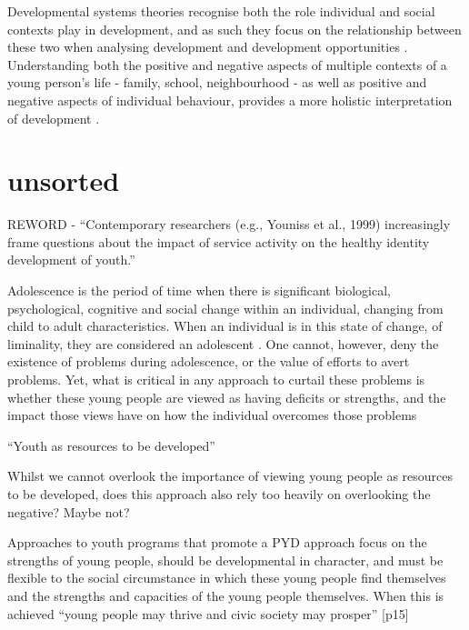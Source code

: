 Developmental systems theories recognise both the role individual and social contexts play in development, and as such they focus on the relationship between these two when analysing development and development opportunities \citep{Lerner2010}. Understanding both the positive and negative aspects of multiple contexts of a young person's life - family, school, neighbourhood - as well as positive and negative aspects of individual behaviour, provides a more holistic interpretation of development \citep{Youngblade2007}. 








\section{unsorted}
REWORD - “Contemporary researchers (e.g., Youniss et al., 1999) increasingly frame questions about the impact of service activity on the healthy identity development of youth.” \citep{Lerner2010}

Adolescence is the period of time when there is significant biological, psychological, cognitive and social change within an individual, changing from child to adult characteristics. When an individual is in this state of change, of liminality, they are considered an adolescent \citep{Lerner2005a}.
One cannot, however, deny the existence of problems during adolescence, or the value of efforts to avert problems. Yet, what is critical in any approach to curtail these problems is whether these young people are viewed as having deficits or strengths, and the impact those views have on how the individual overcomes those problems \citep{Lerner2005a}




“Youth as resources to be developed” \citep{Lerner2005b} %

Whilst we cannot overlook the importance of viewing young people as resources to be developed, does this approach also rely too heavily on overlooking the negative? Maybe not?

Approaches to youth programs that promote a PYD approach focus on the strengths of young people, should be developmental in character, and must be flexible to the social circumstance in which these young people find themselves and the strengths and capacities of the young people themselves. When this is achieved “young people may thrive and civic society may prosper” [p15] \citep{Lerner2005b}




